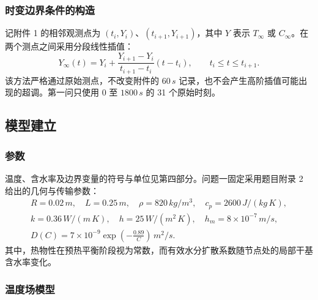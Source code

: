 \documentclass[withoutpreface,bwprint]{cumcmthesis}
\begin{document}
\subsubsection{时变边界条件的构造}

记附件 1 的相邻观测点为 $(t_i,Y_i)$、$(t_{i+1},Y_{i+1})$，其中 $Y$ 表示 $T_\infty$ 或 $C_\infty$。在两个测点之间采用分段线性插值：
\begin{equation}
Y_\infty(t)=Y_i+
\frac{Y_{i+1}-Y_i}{t_{i+1}-t_i}(t-t_i),
\qquad t_i\leq t\leq t_{i+1}.
\label{eq:linear_interp}
\end{equation}
该方法严格通过原始测点，不改变附件的 $60\,\si{s}$ 记录，也不会产生高阶插值可能出现的超调。第一问只使用 $0$ 至 $1800\,\si{s}$ 的 31 个原始时刻。

\subsection{模型建立}

\subsubsection{参数}

温度、含水率及边界变量的符号与单位见第四部分。问题一固定采用题目附录 2 给出的几何与传输参数：
\begin{equation}
\begin{gathered}
R=0.02\,\si{m},\quad L=0.25\,\si{m},\quad
\rho=820\,\si{kg/m^3},\quad c_p=2600\,\si{J/(kg\,K)},\\
k=0.36\,\si{W/(m\,K)},\quad h=25\,\si{W/(m^2\,K)},\quad
h_m=8\times10^{-7}\,\si{m/s},\\
D(C)=7\times10^{-9}\exp\left(-\frac{0.89}{C}\right)\,\si{m^2/s}.
\end{gathered}
\label{eq:diffusivity}
\end{equation}
其中，热物性在预热平衡阶段视为常数，而有效水分扩散系数随节点处的局部干基含水率变化。

\subsubsection{温度场模型}
\end{document}

